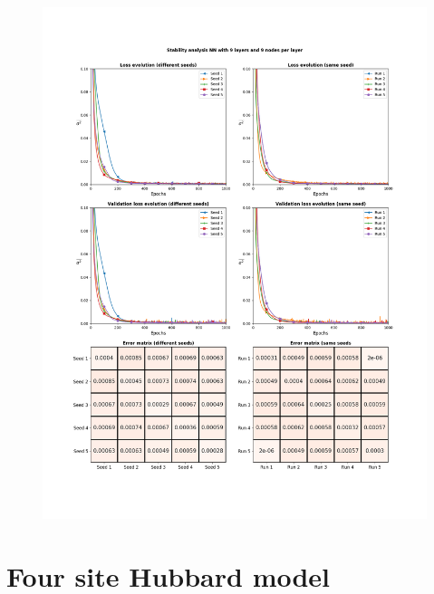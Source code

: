 \documentclass[]{article}
\begin{document}
\begin{figure}
	\centering
	\includegraphics[height=\textheight, width=\textwidth]{"9nodes"}
\end{figure}
\restoregeometry
\clearpage
\newpage
\section{Four site Hubbard model}
\end{document}
